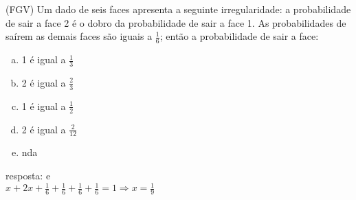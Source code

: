 \begin{ex}
(FGV) Um dado de seis faces apresenta a seguinte irregularidade: a probabilidade de sair a face 2 é o dobro da probabilidade de sair a face 1. As probabilidades de saírem as demais faces são iguais a $\frac{1}{6}$; então a probabilidade de sair a face:
   \begin{enumerate}[(a)]
   \item 1 é igual a $\frac{1}{3}$
   \item 2 é igual a $\frac{2}{3}$
   \item 1 é igual a $\frac{1}{2}$
   \item 2 é igual a $\frac{2}{12}$
   \item nda
   \end{enumerate}
     \begin{sol}
       resposta: e \\
       $x+2x+\frac{1}{6}+\frac{1}{6}+\frac{1}{6}+\frac{1}{6}=1 \Longrightarrow x=\frac{1}{9}$
     \end{sol}
\end{ex}